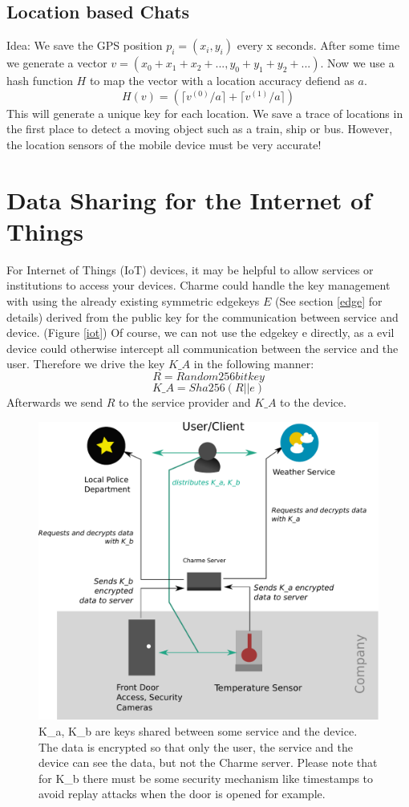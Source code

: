 \documentclass{scrartcl}
\begin{document}
  \subsection{Location based Chats}
  Idea: We save the GPS position $p_i = (x_i,y_i)$  every x seconds. After some time
  we generate a vector $v = (x_0+x_1+x_2+..., y_0+y_1+y_2+...)$. Now we use a hash function $H$ to map the vector with a location accuracy defiend as $a$. 
  $$
  H(v) = (\lceil v^{(0)}/a \rceil +\lceil v^{(1)}/a \rceil )
  $$
  This will generate a unique key for each location. We save a trace of locations in the first place to detect a moving object such as a train, ship or bus.  However, the location sensors of the mobile device must be very accurate!
  
  
  
  \section{Data Sharing for the Internet of Things}
  For Internet of Things (IoT) devices, it may be helpful to allow services or institutions to access your devices. Charme could handle the key management with using the already existing symmetric edgekeys $E$ (See section \ref{edge} for details) derived from the public key for the communication between service and device. (Figure \ref{iot})
Of course, we can not use the edgekey e directly, as a evil device could 
otherwise intercept all communication between the service and the user.
Therefore we drive the key $K\_A$ in the following manner:
$$
R = Random 256bit key
$$
$$
K\_A = Sha256(R || e)
$$
Afterwards we send $R$ to the service provider and $K\_A $ to the device.
\begin{figure}[ht]
	\centering
  \includegraphics[width=120mm]{illustrations/iot.pdf}
	\caption{K\_a, K\_b are keys shared between some service and the device. The data is encrypted so that only the user, the service and the device can see the data, but not the Charme server. Please note that for K\_b there must be some security mechanism  like timestamps to avoid replay attacks when the door is opened for example. \label{iot} }
	\label{figContext}
\end{figure}
  
\end{document}
